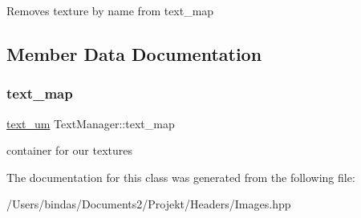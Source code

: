 Removes texture by name from text\+\_\+map 

\subsection{Member Data Documentation}
\mbox{\label{class_text_manager_af04fbfe91b649d756db506ed6e3ba8a9}} 
\subsubsection{\texorpdfstring{text\_map}{text\_map}}
{\footnotesize\ttfamily \mbox{\hyperlink{class_text_manager_ab982469e25633e1e17ef8fffa96712ac}{text\+\_\+um}} Text\+Manager\+::text\+\_\+map\hspace{0.3cm}{\ttfamily [private]}}

container for our textures 

The documentation for this class was generated from the following file\+:\begin{DoxyCompactItemize}
\item 
/\+Users/bindas/\+Documents2/\+Projekt/\+Headers/Images.\+hpp\end{DoxyCompactItemize}
